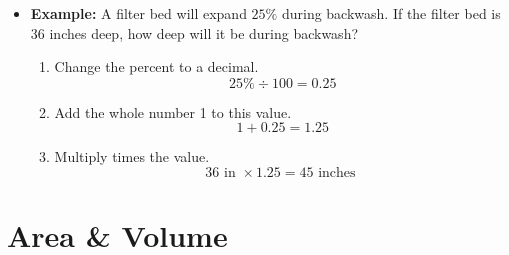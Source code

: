 \begin{itemize}
\item {}

\textbf{Example:} A filter bed will expand $25 \%$ during backwash. If the filter bed is 36 inches deep, how deep will it be during backwash?\\

\begin{enumerate}[Step 1.]
\item Change the percent to a decimal.
$$
25 \% \div 100=0.25
$$
\item Add the whole number 1 to this value.
$$
1+0.25=1.25
$$
\item Multiply times the value.
$$
36 \text { in } \times 1.25=45 \text { inches }
$$
\end{enumerate}
\end{itemize}

















\section{Area \& Volume}

